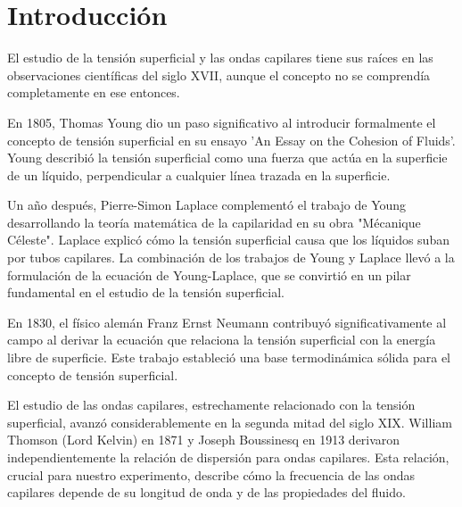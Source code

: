 \section{Introducción}

El estudio de la tensión superficial y las ondas capilares tiene sus raíces en las observaciones científicas del siglo XVII, aunque el concepto no se comprendía completamente en ese entonces.

\vspace{\baselineskip}

En 1805, Thomas Young dio un paso significativo al introducir formalmente el concepto de tensión superficial en su ensayo 'An Essay on the Cohesion of Fluids'. Young describió la tensión superficial como una fuerza que actúa en la superficie de un líquido, perpendicular a cualquier línea trazada en la superficie.

\vspace{\baselineskip}

Un año después, Pierre-Simon Laplace complementó el trabajo de Young desarrollando la teoría matemática de la capilaridad en su obra "Mécanique Céleste". Laplace explicó cómo la tensión superficial causa que los líquidos suban por tubos capilares. La combinación de los trabajos de Young y Laplace llevó a la formulación de la ecuación de Young-Laplace, que se convirtió en un pilar fundamental en el estudio de la tensión superficial.

\vspace{\baselineskip}

En 1830, el físico alemán Franz Ernst Neumann contribuyó significativamente al campo al derivar la ecuación que relaciona la tensión superficial con la energía libre de superficie. Este trabajo estableció una base termodinámica sólida para el concepto de tensión superficial.

\vspace{\baselineskip}

El estudio de las ondas capilares, estrechamente relacionado con la tensión superficial, avanzó considerablemente en la segunda mitad del siglo XIX. William Thomson (Lord Kelvin) en 1871 y Joseph Boussinesq en 1913 derivaron independientemente la relación de dispersión para ondas capilares. Esta relación, crucial para nuestro experimento, describe cómo la frecuencia de las ondas capilares depende de su longitud de onda y de las propiedades del fluido.

\vspace{\baselineskip}

